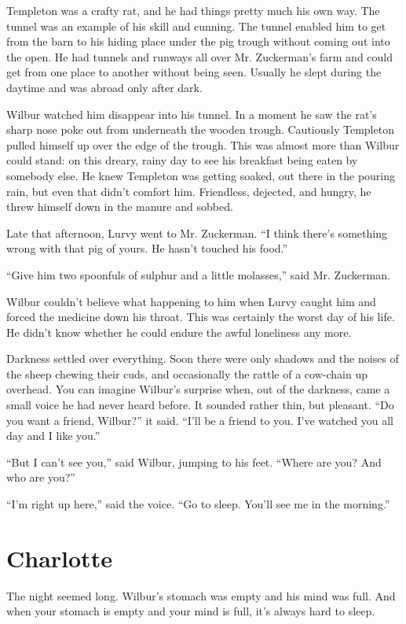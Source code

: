 \documentclass[a4paper, oneside]{book}
\begin{document}
Templeton was a crafty rat, and he had things pretty much his own 
way. The tunnel was an example of his skill and cunning. The
tunnel enabled him to get from the barn to his hiding place under
the pig trough without coming out into the open. He had tunnels
and runways all over Mr. Zuckerman's farm and could get from
one place to another without being seen. Usually he slept during
the daytime and was abroad only after dark. 

 Wilbur watched him disappear into his tunnel. In a moment he
saw the rat's sharp nose poke out from underneath the wooden
trough. Cautiously Templeton pulled himself up over the edge of
the trough. This was almost more than Wilbur could stand: on this
dreary, rainy day to see his breakfast being eaten by somebody else.
He knew Templeton was getting soaked, out there in the pouring
rain, but even that didn't comfort him. Friendless, dejected, and
hungry, he threw himself down in the manure and sobbed.

 Late that afternoon, Lurvy went to Mr. Zuckerman. ``I think
there's something wrong with that pig of yours. He hasn't touched
his food.''

 ``Give him two spoonfuls of sulphur and a little molasses,'' said Mr.
Zuckerman. 

 Wilbur couldn't believe what happening to him when Lurvy
caught him and forced the medicine down his throat. This was
certainly the worst day of his life. He didn't know whether he could 
endure the awful loneliness any more.

 Darkness settled over everything. Soon there were only shadows
and the noises of the sheep chewing their cuds, and occasionally
the rattle of a cow-chain up overhead. You can imagine Wilbur's
surprise when, out of the darkness, came a small voice he had
never heard before. It sounded rather thin, but pleasant. ``Do you
want a friend, Wilbur?'' it said. ``I'll be a friend to you. I've watched
you all day and I like you.''

 ``But I can't see you,'' said Wilbur, jumping to his feet. ``Where are
you? And who are you?'' 

 ``I'm right up here,'' said the voice. ``Go to sleep. You'll see me in
the morning.'' 


 
   \chapter{Charlotte}

The night seemed long. Wilbur's stomach was empty and his
mind was full. And when your stomach is empty and your mind is
full, it's always hard to sleep.
\end{document}
